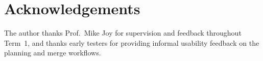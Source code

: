 \section*{Acknowledgements}

\vspace{2cm}

\large

The author thanks Prof.\ Mike Joy for supervision and feedback throughout Term~1, and thanks early testers for providing informal usability feedback on the planning and merge workflows.